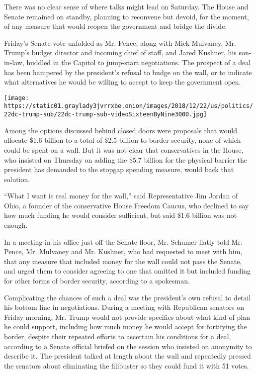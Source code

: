 There was no clear sense of where talks might lead on Saturday. The
House and Senate remained on standby, planning to reconvene but devoid,
for the moment, of any measure that would reopen the government and
bridge the divide.

Friday's Senate vote unfolded as Mr. Pence, along with Mick Mulvaney,
Mr. Trump's budget director and incoming chief of staff, and Jared
Kushner, his son-in-law, huddled in the Capitol to jump-start
negotiations. The prospect of a deal has been hampered by the
president's refusal to budge on the wall, or to indicate what
alternatives he would be willing to accept to keep the government open.

\texttt{[image: https://static01.graylady3jvrrxbe.onion/images/2018/12/22/us/politics/22dc-trump-sub/22dc-trump-sub-videoSixteenByNine3000.jpg]}

Among the options discussed behind closed doors were proposals that
would allocate \$1.6 billion to a total of \$2.5 billion to border
security, none of which could be spent on a wall. But it was not clear
that conservatives in the House, who insisted on Thursday on adding the
\$5.7 billion for the physical barrier the president has demanded to the
stopgap spending measure, would back that solution.

``What I want is real money for the wall,'' said Representative Jim
Jordan of Ohio, a founder of the conservative House Freedom Caucus, who
declined to say how much funding he would consider sufficient, but said
\$1.6 billion was not enough.

In a meeting in his office just off the Senate floor, Mr. Schumer flatly
told Mr. Pence, Mr. Mulvaney and Mr. Kushner, who had requested to meet
with him, that any measure that included money for the wall could not
pass the Senate, and urged them to consider agreeing to one that omitted
it but included funding for other forms of border security, according to
a spokesman.

Complicating the chances of such a deal was the president's own refusal
to detail his bottom line in negotiations. During a meeting with
Republican senators on Friday morning, Mr. Trump would not provide
specifics about what kind of plan he could support, including how much
money he would accept for fortifying the border, despite their repeated
efforts to ascertain his conditions for a deal, according to a Senate
official briefed on the session who insisted on anonymity to describe
it. The president talked at length about the wall and repeatedly pressed
the senators about eliminating the filibuster so they could fund it with
51 votes.

